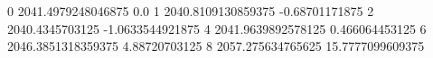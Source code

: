 0 2041.4979248046875 0.0
1 2040.8109130859375 -0.68701171875
2 2040.4345703125 -1.0633544921875
4 2041.9639892578125 0.466064453125
6 2046.3851318359375 4.88720703125
8 2057.275634765625 15.7777099609375
